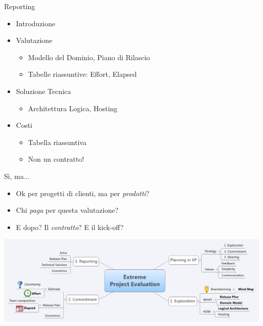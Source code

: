 \documentclass[compress, red, 14pt, pdf]{beamer}
\newcommand{\highlight}[1]{{\color{purple} \emph{#1}}}
\begin{document}
	\begin{frame}{Reporting}
		\begin{itemize}
			\item Introduzione
			\item Valutazione
			\begin{itemize}
				\item Modello del Dominio, Piano di Rilascio
				\item Tabelle riassuntive: Effort, Elapsed
			\end{itemize}
			\item Soluzione Tecnica
			\begin{itemize}
				\item Architettura Logica, Hosting
			\end{itemize}
			\item Costi
			\begin{itemize}
				\item Tabella riassuntiva
				\item Non un contratto!
			\end{itemize}
		\end{itemize}
	\end{frame}
	
	\begin{frame}{Sì, ma...}
		\begin{itemize}
			\item Ok per progetti di clienti, ma per \highlight{prodotti}?
			\item Chi \highlight{paga} per questa valutazione?
			\item E dopo? Il \highlight{contratto}? E il kick-off?
		\end{itemize}
		\begin{center}
			\hspace*{-0.6cm}
			\includegraphics[scale=0.31]{images/takeaway.png}
		\end{center}
	\end{frame}
	
\end{document}
